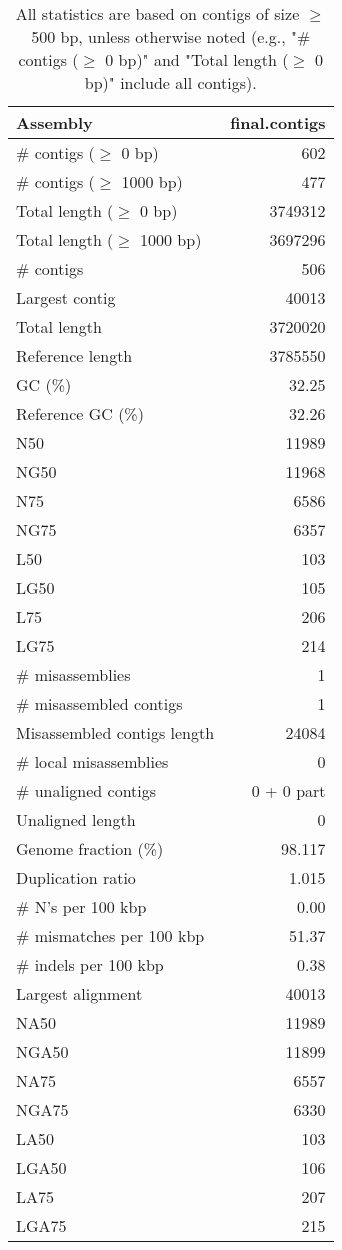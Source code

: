 \documentclass[12pt,a4paper]{article}
\begin{document}
\begin{table}[ht]
\begin{center}
\caption{All statistics are based on contigs of size $\geq$ 500 bp, unless otherwise noted (e.g., "\# contigs ($\geq$ 0 bp)" and "Total length ($\geq$ 0 bp)" include all contigs).}
\begin{tabular}{|l*{1}{|r}|}
\hline
Assembly & final.contigs \\ \hline
\# contigs ($\geq$ 0 bp) & 602 \\ \hline
\# contigs ($\geq$ 1000 bp) & 477 \\ \hline
Total length ($\geq$ 0 bp) & 3749312 \\ \hline
Total length ($\geq$ 1000 bp) & 3697296 \\ \hline
\# contigs & 506 \\ \hline
Largest contig & 40013 \\ \hline
Total length & 3720020 \\ \hline
Reference length & 3785550 \\ \hline
GC (\%) & 32.25 \\ \hline
Reference GC (\%) & 32.26 \\ \hline
N50 & 11989 \\ \hline
NG50 & 11968 \\ \hline
N75 & 6586 \\ \hline
NG75 & 6357 \\ \hline
L50 & 103 \\ \hline
LG50 & 105 \\ \hline
L75 & 206 \\ \hline
LG75 & 214 \\ \hline
\# misassemblies & 1 \\ \hline
\# misassembled contigs & 1 \\ \hline
Misassembled contigs length & 24084 \\ \hline
\# local misassemblies & 0 \\ \hline
\# unaligned contigs & 0 + 0 part \\ \hline
Unaligned length & 0 \\ \hline
Genome fraction (\%) & 98.117 \\ \hline
Duplication ratio & 1.015 \\ \hline
\# N's per 100 kbp & 0.00 \\ \hline
\# mismatches per 100 kbp & 51.37 \\ \hline
\# indels per 100 kbp & 0.38 \\ \hline
Largest alignment & 40013 \\ \hline
NA50 & 11989 \\ \hline
NGA50 & 11899 \\ \hline
NA75 & 6557 \\ \hline
NGA75 & 6330 \\ \hline
LA50 & 103 \\ \hline
LGA50 & 106 \\ \hline
LA75 & 207 \\ \hline
LGA75 & 215 \\ \hline
\end{tabular}
\end{center}
\end{table}
\end{document}
